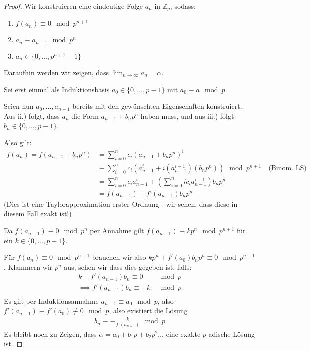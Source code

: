 \documentclass{report}
\newcommand*{\newpar}{\par\vspace{\baselineskip}\noindent}
\newcommand{\bZ}{\mathbb{Z}}
\begin{document}
	\begin{proof}
		Wir konstruieren eine eindeutige Folge $a_n$ in $\bZ_p$, sodass:
		\begin{enumerate}
			\item $f(a_n) \equiv 0 \mod p^{n + 1}$
			\item $a_n \equiv a_{n - 1} \mod p^n$
			\item $a_n \in  \{0, \hdots, p^{n+1} - 1\}$
		\end{enumerate}
	\noindent Daraufhin werden wir zeigen, dass $\displaystyle \lim_{n \to \infty} a_n = \alpha$.
	\newpar
	Sei erst einmal als Induktionsbasis $a_0 \in \{0, \hdots, p - 1\}$ mit $a_0 \equiv a \mod p$.
	\newpar
	Seien nun $a_0, \hdots, a_{n-1}$ bereits mit den gewünschten Eigenschaften konstruiert.
	Aus ii.) folgt, dass $a_n$ die Form $a_{n-1} + b_np^n$ haben muss, und aus iii.) folgt $b_n \in \{0, \hdots, p-1\}$.
	\newpar 
	Also gilt:
	\begin{align*}
		f(a_n) = f(a_{n - 1} + b_np^n) &= \sum_{i = 0}^n c_i(a_{n - 1} + b_np^n)^i\\
			                         &\equiv \sum_{i = 0}^n c_i(a_{n-1}^i + i(a_{n-1}^{i-1})(b_np^n)) \mod p^{n+1} \quad\text{(Binom. LS)}\\
			                    	 &= \sum_{i = 0}^n c_ia_{n-1}^i + \left(\sum_{i = 0}^nic_i a_{n-1}^{i-1}\right)b_np^n\\
			                    	 &= f(a_{n-1}) + f'(a_{n-1}) b_n p^n
	\end{align*}
	(Dies ist eine Taylorapproximation erster Ordnung - wir sehen, dass diese in diesem Fall exakt ist!)
	\newpar
	Da $f(a_{n-1}) \equiv 0 \mod p^n$ per Annahme gilt $f(a_{n-1}) \equiv kp^{n} \mod p^{n+1}$ für ein $k \in \{0, \hdots, p-1\}$.
	\newpar
	Für $f(a_n) \equiv 0 \mod p^{n+1}$ brauchen wir also $kp^{n} + f'(a_0) b_n p^n \equiv 0 \mod p^{n+1}$. Klammern wir $p^n$ aus, sehen wir dass dies gegeben ist, falls:
	\begin{align*}
		k + f'(a_{n-1}) b_n \equiv 0 &\mod p\\
		\implies f'(a_{n-1}) b_n \equiv -k &\mod p\\
	\end{align*}
	Es gilt per Induktionsannahme $a_{n-1} \equiv a_0 \mod p$, also $f'(a_{n-1}) \equiv f'(a_0) \not\equiv 0 \mod p$, also existiert die Lösung
	\begin{align*}
		b_n \equiv -\frac{k}{f'(a_{n-1})} \mod p
	\end{align*}
	Es bleibt noch zu Zeigen, dass $\alpha = a_0 + b_1p + b_2p^2 \hdots$ eine exakte $p$-adische Lösung ist. 

\end{proof}
\end{document}
